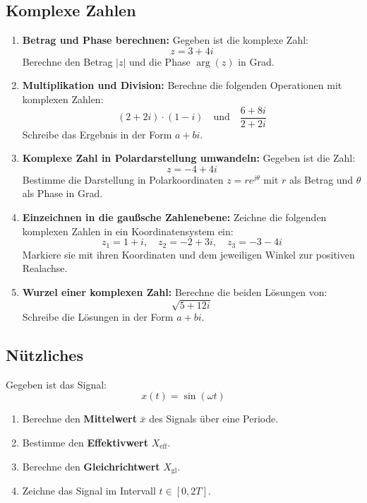 \documentclass[11pt,a4paper]{article}
\begin{document}
\subsection{Komplexe Zahlen}
\begin{enumerate}
    \item \textbf{Betrag und Phase berechnen:}  
    Gegeben ist die komplexe Zahl:  
    \[
    z = 3 + 4i
    \]
    Berechne den Betrag \( |z| \) und die Phase \( \arg(z) \) in Grad.

    \item \textbf{Multiplikation und Division:}  
    Berechne die folgenden Operationen mit komplexen Zahlen:  
    \[
    (2 + 2i) \cdot (1 - i) \quad \text{und} \quad \frac{6 + 8i}{2 + 2i}
    \]
    Schreibe das Ergebnis in der Form \( a + bi \).

    \item \textbf{Komplexe Zahl in Polardarstellung umwandeln:}  
    Gegeben ist die Zahl:
    \[
    z = -4 + 4i
    \]
    Bestimme die Darstellung in Polarkoordinaten \( z = r e^{j\theta} \) mit \( r \) als Betrag und \( \theta \) als Phase in Grad.

    \item \textbf{Einzeichnen in die gaußsche Zahlenebene:}  
    Zeichne die folgenden komplexen Zahlen in ein Koordinatensystem ein:  
    \[
    z_1 = 1 + i, \quad z_2 = -2 + 3i, \quad z_3 = -3 - 4i
    \]
    Markiere sie mit ihren Koordinaten und dem jeweiligen Winkel zur positiven Realachse.

    \item \textbf{Wurzel einer komplexen Zahl:}  
    Berechne die beiden Lösungen von:
    \[
    \sqrt{5 + 12i}
    \]
    Schreibe die Lösungen in der Form \( a + bi \).
\end{enumerate}
\subsection{Nützliches}

Gegeben ist das Signal:
\[
x(t) = \sin(\omega t)
\]

\begin{enumerate}
    \item Berechne den \textbf{Mittelwert} \( \bar{x} \) des Signals über eine Periode.
    \item Bestimme den \textbf{Effektivwert} \( X_{\text{eff}} \).
    \item Berechne den \textbf{Gleichrichtwert} \( X_{\text{gl}} \).
    \item Zeichne das Signal im Intervall \( t \in [0, 2T] \).
\end{enumerate}
\end{document}
